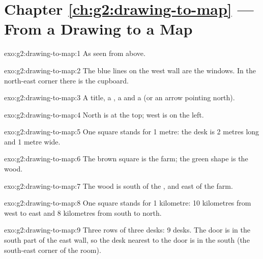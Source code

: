 \section*{Chapter \ref{ch:g2:drawing-to-map} --- From a Drawing to a Map}

\begin{solution}{exo:g2:drawing-to-map:1}
As seen from above.
\end{solution}

\begin{solution}{exo:g2:drawing-to-map:2}
The blue lines on the west wall are the windows. In the north-east corner
there is the cupboard.
\end{solution}

\begin{solution}{exo:g2:drawing-to-map:3}
A title, a , a  and a  (or an arrow pointing north).
\end{solution}

\begin{solution}{exo:g2:drawing-to-map:4}
North is at the top; west is on the left.
\end{solution}

\begin{solution}{exo:g2:drawing-to-map:5}
One square stands for 1 metre: the desk is 2 metres long and 1 metre wide.
\end{solution}

\begin{solution}{exo:g2:drawing-to-map:6}
The brown square is the farm; the green shape is the wood.
\end{solution}

\begin{solution}{exo:g2:drawing-to-map:7}
The wood is south of the , and east of the farm.
\end{solution}

\begin{solution}{exo:g2:drawing-to-map:8}
One square stands for 1 kilometre: 10 kilometres from west to east and 8
kilometres from south to north.
\end{solution}

\begin{solution}{exo:g2:drawing-to-map:9}
Three rows of three desks: 9 desks. The door is in the south part of the
east wall, so the desk nearest to the door is in the south (the south-east
corner of the room).
\end{solution}

